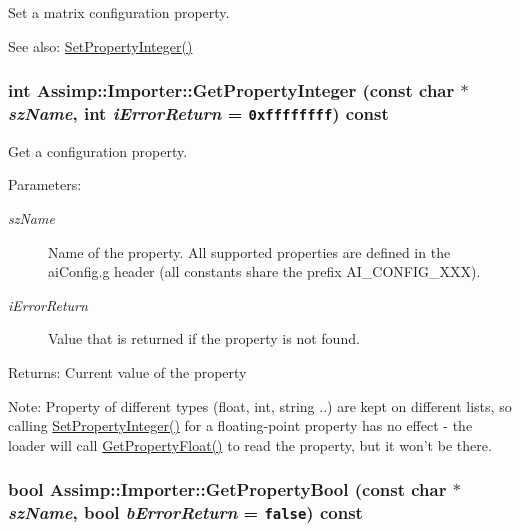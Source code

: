 Set a matrix configuration property. \begin{Desc}
\item[See also:]\hyperlink{class_assimp_1_1_importer_2542eed3d5f491025c4095b4e55fa068}{SetPropertyInteger()} \end{Desc}
\hypertarget{class_assimp_1_1_importer_3e796a0758a9f10f13107f44c542ad41}{
\subsubsection[GetPropertyInteger]{\setlength{\rightskip}{0pt plus 5cm}int Assimp::Importer::GetPropertyInteger (const char $\ast$ {\em szName}, \/  int {\em iErrorReturn} = {\tt 0xffffffff}) const}}
\label{class_assimp_1_1_importer_3e796a0758a9f10f13107f44c542ad41}


Get a configuration property. \begin{Desc}
\item[Parameters:]
\begin{description}
\item[{\em szName}]Name of the property. All supported properties are defined in the aiConfig.g header (all constants share the prefix AI\_\-CONFIG\_\-XXX). \item[{\em iErrorReturn}]Value that is returned if the property is not found. \end{description}
\end{Desc}
\begin{Desc}
\item[Returns:]Current value of the property \end{Desc}
\begin{Desc}
\item[Note:]Property of different types (float, int, string ..) are kept on different lists, so calling \hyperlink{class_assimp_1_1_importer_2542eed3d5f491025c4095b4e55fa068}{SetPropertyInteger()} for a floating-point property has no effect - the loader will call \hyperlink{class_assimp_1_1_importer_dfe1387ccc837fd59bf620e8216637fa}{GetPropertyFloat()} to read the property, but it won't be there. \end{Desc}
\hypertarget{class_assimp_1_1_importer_90f5d35d25e5d2a0ef8bc0c6545b2010}{
\subsubsection[GetPropertyBool]{\setlength{\rightskip}{0pt plus 5cm}bool Assimp::Importer::GetPropertyBool (const char $\ast$ {\em szName}, \/  bool {\em bErrorReturn} = {\tt false}) const}}
\label{class_assimp_1_1_importer_90f5d35d25e5d2a0ef8bc0c6545b2010}


